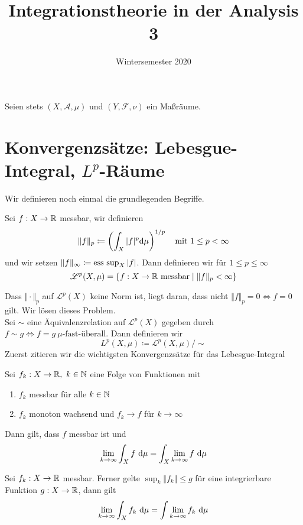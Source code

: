 \documentclass[a4paper,12pt]{scrartcl}
\title{Integrationstheorie in der Analysis 3}
\date{Wintersemester 2020}
\author{}
\begin{document}
\maketitle
Seien stets $(X,\mathscr{A},\mu)$ und $(Y,\mathscr{F},\nu)$ ein Maßräume.
\section{Konvergenzsätze: Lebesgue-Integral, $L^p$-Räume}
Wir definieren noch einmal die grundlegenden Begriffe.
    \begin{defn} Sei $f:X\to \mathbb{R}$ messbar, wir definieren 
        \[
        \Vert f\Vert_p \coloneqq \left(\int_X \vert f\vert^p \D \mu\right)^{1/p} \quad \mathrm{mit } \ 1\le p<\infty    
        \]
        und wir setzen $\Vert f\Vert_\infty \coloneqq \operatorname{\operatorname{ess \ sup}}_X \vert f\vert$. Dann definieren wir für $1\le p\le \infty$
        \[
        \mathscr{L}^p(X,\mu) = \{f:X\to \R \ \mathrm{messbar} \mid \Vert f\Vert_p<\infty\}    
        \]
    \end{defn}
    Dass $\Vert \cdot\Vert_p$ auf $\mathscr{L}^p(X)$ keine Norm ist, liegt daran, dass 
    nicht $\Vert f\Vert_p = 0 \iff f=0$ gilt. Wir lösen dieses Problem.\\
    Sei $\sim$ eine Äquivalenzrelation auf $\mathscr{L}^p(X)$ gegeben durch $f\sim g\iff f=g \ \mu\text{-fast-überall}$. Dann definieren wir
    \[
    L^p(X,\mu) \coloneqq \mathscr{L}^p(X,\mu)/\sim    
    \] 
     Zuerst zitieren wir die wichtigsten 
    Konvergenzsätze für das Lebesgue-Integral
    \begin{satz} Sei $f_k:X\to \mathbb{R}, \ k\in \mathbb{N}$ eine Folge von Funktionen mit 
    \begin{enumerate}
        \item $f_k$ messbar für alle $k\in \mathbb{N}$
        \item $f_k$ monoton wachsend und $f_k \to f$ für $k\to \infty$
    \end{enumerate} Dann gilt, dass $f$ messbar ist und
        \[
        \lim_{k\to \infty} \int_X f\ \mathrm{d} \mu = \int_X \lim_{k\to \infty} f\ \mathrm{d} \mu    
        \]
    \end{satz}
    \begin{satz} Sei $f_k:X\to \mathbb{R}$ messbar. Ferner gelte ${\sup_k \Vert f_k\Vert \le g}$ für eine integrierbare Funktion $g:X\to \mathbb{R}$, dann gilt
        \[
        \lim_{k\to \infty} \int_X f_k \ \mathrm{d} \mu = \int \lim_{k\to\infty } f_k \ \mathrm{d} \mu    
        \]
    \end{satz}
\end{document}
